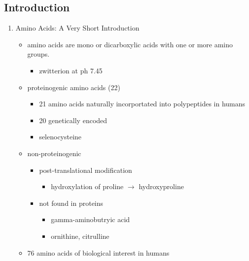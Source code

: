 \documentclass{scrartcl}
\begin{document}
\subsection{Introduction}
\label{sec:org7c91ced}
\begin{enumerate}
\item Amino Acids: A Very Short Introduction
\label{sec:org1c700a9}
\begin{itemize}
\item amino acids are mono or dicarboxylic acids with one or more amino groups.
\begin{itemize}
\item zwitterion at ph 7.45
\end{itemize}

\item proteinogenic amino acids (22)
\begin{itemize}
\item 21 amino acids naturally incorportated into polypeptides in humans
\item 20 genetically encoded
\item selenocysteine
\end{itemize}

\item non-proteinogenic
\begin{itemize}
\item post-translational modification
\begin{itemize}
\item hydroxylation of proline \(\to\) hydroxyproline
\end{itemize}
\item not found in proteins
\begin{itemize}
\item gamma-aminobutryic acid
\item ornithine, citrulline
\end{itemize}
\end{itemize}

\item 76 amino acids of biological interest in humans
\end{itemize}


\end{enumerate}
\end{document}
